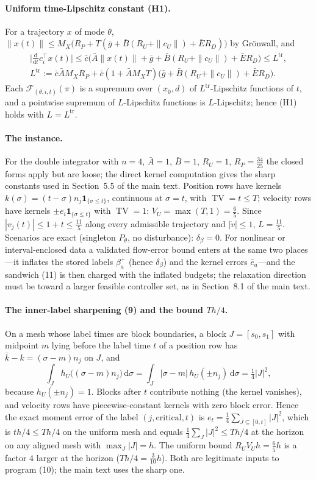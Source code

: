 \documentclass[11pt,a4paper]{article}
\theoremstyle{plain}
\theoremstyle{definition}
\theoremstyle{remark}
\newcommand{\calF}{\mathcal{F}}
\newcommand{\ebar}{\bar e}
\newcommand{\tfr}[2]{\tfrac{#1}{#2}}
\newcommand{\dd}{\,\mathrm{d}}
\DeclareMathOperator{\TV}{TV}
\begin{document}
\paragraph{Uniform time-Lipschitz constant (H1).}
For a trajectory $x$ of mode $\theta$, $\|x(t)\|\le M_X\bigl(R_P+T(\bar g+\bar B(R_U+\|c_U\|)+\bar ER_D)\bigr)$ by Gr\"onwall, and
\begin{gather*}
\bigl|\tfrac{\mathrm d}{\mathrm dt}c_i^\top x(t)\bigr|\le\bar c\bigl(\bar A\|x(t)\|+\bar g+\bar B(R_U+\|c_U\|)+\bar ER_D\bigr)\le L^{\mathrm{tr}},\\
L^{\mathrm{tr}}:=\bar c\bar AM_XR_P+\bar c(1+\bar AM_XT)\bigl(\bar g+\bar B(R_U+\|c_U\|)+\bar ER_D\bigr).
\end{gather*}
Each $\calF_{(\theta,i,t)}(\pi)$ is a supremum over $(x_0,d)$ of $L^{\mathrm{tr}}$-Lipschitz functions of $t$, and a pointwise supremum of $L$-Lipschitz functions is $L$-Lipschitz; hence (H1) holds with $L=L^{\mathrm{tr}}$.

\paragraph{The instance.}
For the double integrator with $n=4$, $\bar A=1$, $\bar B=1$, $R_U=1$, $R_P=\tfr{34}{25}$ the closed forms apply but are loose; the direct kernel computation gives the sharp constants used in Section~5.5 of the main text. Position rows have kernels $k(\sigma)=(t-\sigma)n_j\mathbf 1_{\{\sigma\le t\}}$, continuous at $\sigma=t$, with $\TV=t\le T$; velocity rows have kernels $\pm e_i\mathbf 1_{\{\sigma\le t\}}$ with $\TV=1$: $V_U=\max(T,1)=\tfr65$. Since $|v_j(t)|\le1+t\le\tfr{11}5$ along every admissible trajectory and $|\dot v|\le1$, $L=\tfr{11}5$. Scenarios are exact (singleton $P_\theta$, no disturbance): $\delta_\beta=0$. For nonlinear or interval-enclosed data a validated flow-error bound enters at the same two places---it inflates the stored labels $\beta^+_a$ (hence $\delta_\beta$) and the kernel errors $\ebar_a$---and the sandwich (11) is then charged with the inflated budgets; the relaxation direction must be toward a larger feasible controller set, as in Section~8.1 of the main text.

\paragraph{The inner-label sharpening (9) and the bound $Th/4$.}
On a mesh whose label times are block boundaries, a block $J=[s_0,s_1]$ with midpoint $m$ lying before the label time $t$ of a position row has $\bar k-k=(\sigma-m)n_j$ on $J$, and
\[
\int_Jh_U\bigl((\sigma-m)n_j\bigr)\dd\sigma=\int_J|\sigma-m|\,h_U(\pm n_j)\dd\sigma=\tfrac14|J|^2 ,
\]
because $h_U(\pm n_j)=1$. Blocks after $t$ contribute nothing (the kernel vanishes), and velocity rows have piecewise-constant kernels with zero block error. Hence the exact moment error of the label $(j,\text{critical},t)$ is $e_t=\tfrac14\sum_{J\subseteq[0,t]}|J|^2$, which is $th/4\le Th/4$ on the uniform mesh and equals $\tfrac14\sum_J|J|^2\le Th/4$ at the horizon on any aligned mesh with $\max_J|J|=h$. The uniform bound $R_UV_Uh=\tfr65h$ is a factor $4$ larger at the horizon ($Th/4=\tfr3{10}h$). Both are legitimate inputs to program (10); the main text uses the sharp one.
\end{document}

